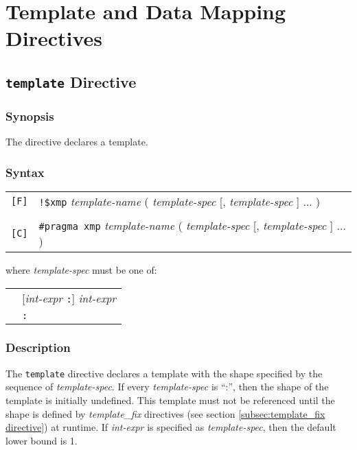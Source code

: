 \section{Template and Data Mapping Directives}

\subsection{{\tt template} Directive}

\subsubsection*{Synopsis}

The {\tt {}} directive declares a template. 

\subsubsection*{Syntax}

\begin{tabular}{ll}
\verb![F]! & \verb|!$xmp| {\it template-name} ( {\it template-spec} 
[, {\it template-spec} ] ... ) \\
& \\
\verb![C]! & \verb|#pragma xmp|  {\it template-name} ( {\it template-spec} 
[, {\it template-spec} ] ... ) \\
\end{tabular}
\vspace{0.3cm}

where {\it template-spec} must be one of:

\hspace{\hsize}

\begin{tabular}{ll}
 \hspace{0.5cm} & [{\it int-expr} {\tt :}] {\it int-expr} \\
 \hspace{0.5cm} & {\tt :} \\
\end{tabular}

\subsubsection*{Description}

The {\tt template} directive declares a template with the shape specified by
the sequence of {\it template-spec}. If every {\it template-spec} is
``:'', then the shape of the template is initially undefined. This
template must not be referenced until the shape is defined by {\it
template\_fix} directives (see section \ref{subsec:template_fix
directive}) at runtime. If {\it int-expr} is specified as {\it
template-spec}, then the default lower bound is 1.

